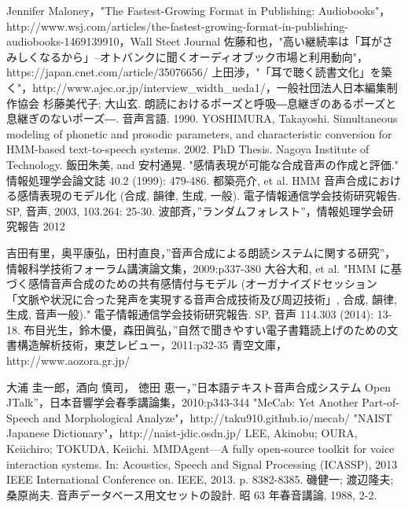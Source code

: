 \begin{thebibliography}{99}

 Jennifer Maloney，"The Fastest-Growing Format in Publishing: Audiobooks"，http://www.wsj.com/articles/the-fastest-growing-format-in-publishing-audiobooks-1469139910，Wall Steet Journal
 佐藤和也，"高い継続率は「耳がさみしくなるから」--オトバンクに聞くオーディオブック市場と利用動向"，https://japan.cnet.com/article/35076656/
 上田渉，"「耳で聴く読書文化」を築く"，http://www.ajec.or.jp/interview\_width\_ueda1/，一般社団法人日本編集制作協会
 杉藤美代子; 大山玄. 朗読におけるポーズと呼吸―息継ぎのあるポーズと息継ぎのないポーズ―. 音声言語. 1990.
 YOSHIMURA, Takayoshi. Simultaneous modeling of phonetic and prosodic parameters, and characteristic conversion for HMM-based text-to-speech systems. 2002. PhD Thesis. Nagoya Institute of Technology.
 飯田朱美, and 安村通晃. "感情表現が可能な合成音声の作成と評価." 情報処理学会論文誌 40.2 (1999): 479-486.
 都築亮介, et al. HMM 音声合成における感情表現のモデル化 (合成, 韻律, 生成, 一般). 電子情報通信学会技術研究報告. SP, 音声, 2003, 103.264: 25-30.
 波部斉，”ランダムフォレスト”，情報処理学会研究報告 2012

 吉田有里，奥平康弘，田村直良，”音声合成による朗読システムに関する研究”，情報科学技術フォーラム講演論文集，2009:p337-380
 大谷大和, et al. "HMM に基づく感情音声合成のための共有感情付与モデル (オーガナイズドセッション 「文脈や状況に合った発声を実現する音声合成技術及び周辺技術」, 合成, 韻律, 生成, 音声一般)." 電子情報通信学会技術研究報告. SP, 音声 114.303 (2014): 13-18.
 布目光生，鈴木優，森田眞弘，”自然で聞きやすい電子書籍読上げのための文書構造解析技術，東芝レビュー，2011:p32-35
 青空文庫，http://www.aozora.gr.jp/

 大浦 圭一郎，酒向 慎司， 徳田 恵一，”日本語テキスト音声合成システム Open JTalk”，日本音響学会春季講論集，2010:p343-344
 "MeCab: Yet Another Part-of-Speech and Morphological Analyze"，http://taku910.github.io/mecab/
 "NAIST Japanese Dictionary"，http://naist-jdic.osdn.jp/
 LEE, Akinobu; OURA, Keiichiro; TOKUDA, Keiichi. MMDAgent—A fully open-source toolkit for voice interaction systems. In: Acoustics, Speech and Signal Processing (ICASSP), 2013 IEEE International Conference on. IEEE, 2013. p. 8382-8385.
 磯健一; 渡辺隆夫; 桑原尚夫. 音声データベース用文セットの設計. 昭 63 年春音講論, 1988, 2-2.


\end{thebibliography}
